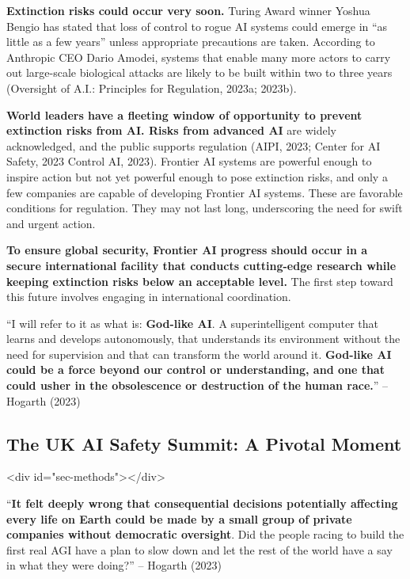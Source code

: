 \documentclass[12pt,a4paper]{article}
\begin{document}
\textbf{Extinction risks could occur very soon.} Turing Award winner Yoshua Bengio has stated that loss of control to rogue AI systems could emerge in “as little as a few years” unless appropriate precautions are taken. According to Anthropic CEO Dario Amodei, systems that enable many more actors to carry out large-scale biological attacks are likely to be built within two to three years (Oversight of A.I.: Principles for Regulation, 2023a; 2023b).

\textbf{World leaders have a fleeting window of opportunity to prevent extinction risks from AI. Risks from advanced AI} are widely acknowledged, and the public supports regulation (AIPI, 2023; Center for AI Safety, 2023 Control AI, 2023). Frontier AI systems are powerful enough to inspire action but not yet powerful enough to pose extinction risks, and only a few companies are capable of developing Frontier AI systems. These are favorable conditions for regulation. They may not last long, underscoring the need for swift and urgent action.

\textbf{To ensure global security, Frontier AI progress should occur in a secure international facility that conducts cutting-edge research while keeping extinction risks below an acceptable level.} The first step toward this future involves engaging in international coordination. 

\hfill\begin{minipage}{\dimexpr\textwidth-1cm}
“I will refer to it as what is: \textbf{God-like AI}. A superintelligent computer that learns and develops autonomously, that understands its environment without the need for supervision and that can transform the world around it. \textbf{God-like AI could be a force beyond our control or understanding, and one that could usher in the obsolescence or destruction of the human race.}” – Hogarth (2023)
\end{minipage}


\subsection{The UK AI Safety Summit: A Pivotal Moment }<div id="sec-methods"></div>

\hfill\begin{minipage}{\dimexpr\textwidth-1cm}
“\textbf{It felt deeply wrong that consequential decisions potentially affecting every life on Earth could be made by a small group of private companies without democratic oversight}. Did the people racing to build the first real AGI have a plan to slow down and let the rest of the world have a say in what they were doing?” – Hogarth (2023)
\end{minipage}
\hspace{1cm}
\end{document}
